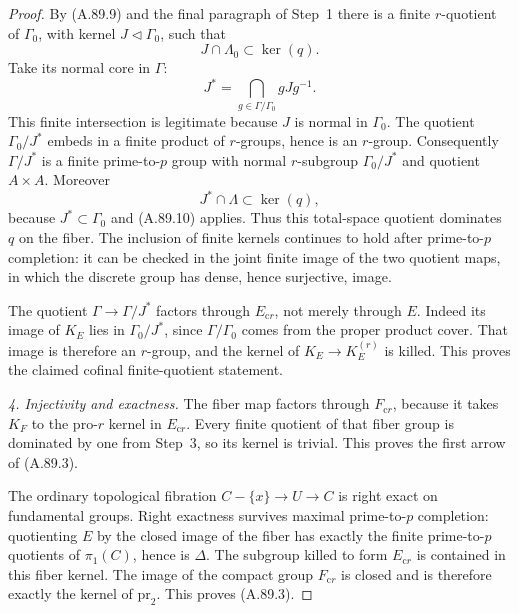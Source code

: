 \documentclass[11pt]{article}
\begin{document}
\begin{proof}
By (A.89.9) and the final paragraph of Step~1 there is
a finite \(r\)-quotient of \(\Gamma_0\), with kernel
\(J\triangleleft\Gamma_0\), such that
\[
                         J\cap\Lambda_0\subset\ker(q).
                                                        \tag{A.89.10}
\]
Take its normal core in \(\Gamma\):
\[
                  J^*=\bigcap_{g\in\Gamma/\Gamma_0}gJg^{-1}.
                                                        \tag{A.89.11}
\]
This finite intersection is legitimate because \(J\) is
normal in \(\Gamma_0\). The quotient
\(\Gamma_0/J^*\) embeds in a finite product of
\(r\)-groups, hence is an \(r\)-group. Consequently
\(\Gamma/J^*\) is a finite prime-to-\(p\) group with
normal \(r\)-subgroup \(\Gamma_0/J^*\) and quotient
\(A\times A\). Moreover
\[
                 J^*\cap\Lambda\subset\ker(q),
                                                        \tag{A.89.12}
\]
because \(J^*\subset\Gamma_0\) and (A.89.10) applies.
Thus this total-space quotient dominates \(q\) on the
fiber. The inclusion of finite kernels continues to hold
after prime-to-\(p\) completion: it can be checked in
the joint finite image of the two quotient maps, in which
the discrete group has dense, hence surjective, image.

The quotient \(\Gamma\to\Gamma/J^*\) factors through
\(E_{\mathrm{c}r}\), not merely through \(E\).
Indeed its image of \(K_E\) lies in
\(\Gamma_0/J^*\), since \(\Gamma/\Gamma_0\) comes
from the proper product cover. That image is therefore an
\(r\)-group, and the kernel of \(K_E\to K_E^{(r)}\)
is killed. This proves the claimed cofinal finite-quotient
statement.

\emph{4. Injectivity and exactness.}
The fiber map factors through \(F_{\mathrm{c}r}\),
because it takes \(K_F\) to the pro-\(r\) kernel in
\(E_{\mathrm{c}r}\). Every finite quotient of that fiber
group is dominated by one from Step~3, so its kernel is
trivial. This proves the first arrow of (A.89.3).

The ordinary topological fibration
\(C-\{x\}\to U\to C\) is right exact on fundamental
groups. Right exactness survives maximal prime-to-\(p\)
completion: quotienting \(E\) by the closed image of
the fiber has exactly the finite prime-to-\(p\) quotients
of \(\pi_1(C)\), hence is \(\Delta\). The subgroup
killed to form \(E_{\mathrm{c}r}\) is contained in
this fiber kernel. The image of the compact group
\(F_{\mathrm{c}r}\) is closed and is therefore exactly
the kernel of \(\mathrm{pr}_2\). This proves (A.89.3).


\end{proof}
\end{document}

